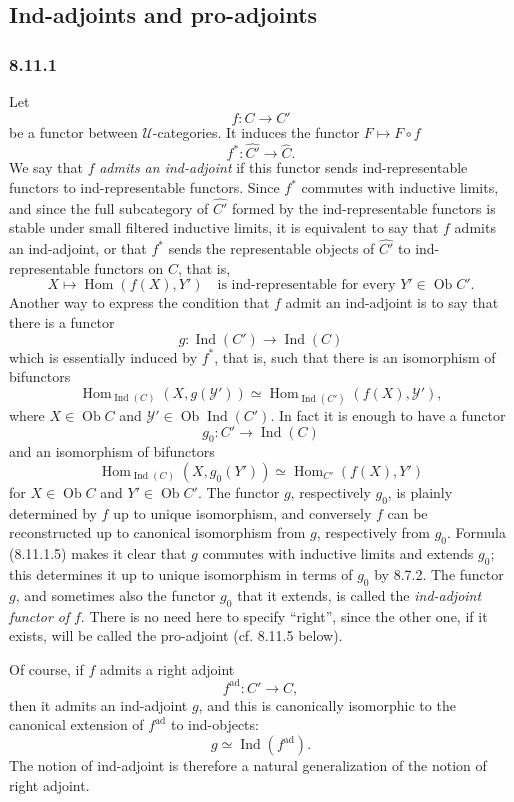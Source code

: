 \documentclass[11pt]{article}
\newcommand{\U}{\mathcal{U}}
\newcommand{\Ob}{\operatorname{Ob}}
\newcommand{\Hom}{\operatorname{Hom}}
\newcommand{\Ind}{\operatorname{Ind}}
\newcommand{\ad}{\mathrm{ad}}
\begin{document}
\subsection{Ind-adjoints and pro-adjoints}

\subsubsection*{8.11.1}
Let
\[
 f:C\longrightarrow C'
\tag{8.11.1.1}
\]
be a functor between $\U$-categories. It induces the functor $F\mapsto F\circ f$
\[
 f^*:\widehat{C'}\longrightarrow\widehat C.
\tag{8.11.1.2}
\]
We say that $f$ \emph{admits an ind-adjoint} if this functor sends ind-representable functors to ind-representable functors. Since $f^*$ commutes with inductive limits, and since the full subcategory of $\widehat{C'}$ formed by the ind-representable functors is stable under small filtered inductive limits, it is equivalent to say that $f$ admits an ind-adjoint, or that $f^*$ sends the representable objects of $\widehat{C'}$ to ind-representable functors on $C$, that is,
\[
 X\longmapsto \Hom(f(X),Y')\quad\text{is ind-representable for every }Y'\in\Ob C'.
\tag{8.11.1.3}
\]
Another way to express the condition that $f$ admit an ind-adjoint is to say that there is a functor
\[
 g:\Ind(C')\longrightarrow\Ind(C)
\tag{8.11.1.4}
\]
which is essentially induced by $f^*$, that is, such that there is an isomorphism of bifunctors
\[
 \Hom_{\Ind(C)}(X,g(\mathcal Y'))\simeq
 \Hom_{\Ind(C')}(f(X),\mathcal Y'),
\tag{8.11.1.5}
\]
where $X\in\Ob C$ and $\mathcal Y'\in\Ob\Ind(C')$. In fact it is enough to have a functor
\[
 g_0:C'\longrightarrow\Ind(C)
\tag{8.11.1.6}
\]
and an isomorphism of bifunctors
\[
 \Hom_{\Ind(C)}(X,g_0(Y'))\simeq \Hom_{C'}(f(X),Y')
\tag{8.11.1.7}
\]
for $X\in\Ob C$ and $Y'\in\Ob C'$. The functor $g$, respectively $g_0$, is plainly determined by $f$ up to unique isomorphism, and conversely $f$ can be reconstructed up to canonical isomorphism from $g$, respectively from $g_0$. Formula (8.11.1.5) makes it clear that $g$ commutes with inductive limits and extends $g_0$; this determines it up to unique isomorphism in terms of $g_0$ by 8.7.2. The functor $g$, and sometimes also the functor $g_0$ that it extends, is called the \emph{ind-adjoint functor of} $f$. There is no need here to specify ``right'', since the other one, if it exists, will be called the pro-adjoint (cf. 8.11.5 below).

Of course, if $f$ admits a right adjoint
\[
 f^{\ad}:C'\longrightarrow C,
\]
then it admits an ind-adjoint $g$, and this is canonically isomorphic to the canonical extension of $f^{\ad}$ to ind-objects:
\[
 g\simeq \Ind(f^{\ad}).
\tag{8.11.1.8}
\]
The notion of ind-adjoint is therefore a natural generalization of the notion of right adjoint.
\end{document}
